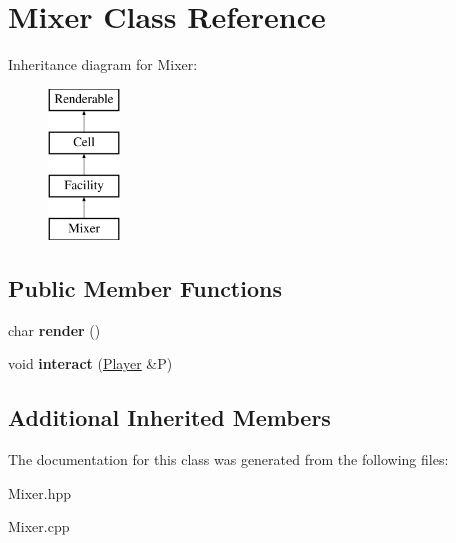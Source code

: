 \hypertarget{class_mixer}{}\section{Mixer Class Reference}
\label{class_mixer}
Inheritance diagram for Mixer\+:\begin{figure}[H]
\begin{center}
\leavevmode
\includegraphics[height=4.000000cm]{class_mixer}
\end{center}
\end{figure}
\subsection*{Public Member Functions}
\begin{DoxyCompactItemize}
\item 
\mbox{\label{class_mixer_a1cad77a40034f7c0f6cf47e8185ba0a3}} 
char {\bfseries render} ()
\item 
\mbox{\label{class_mixer_aec7813341b8f42c7e81732661ea34b23}} 
void {\bfseries interact} (\mbox{\hyperlink{class_player}{Player}} \&P)
\end{DoxyCompactItemize}
\subsection*{Additional Inherited Members}


The documentation for this class was generated from the following files\+:\begin{DoxyCompactItemize}
\item 
Mixer.\+hpp\item 
Mixer.\+cpp\end{DoxyCompactItemize}
